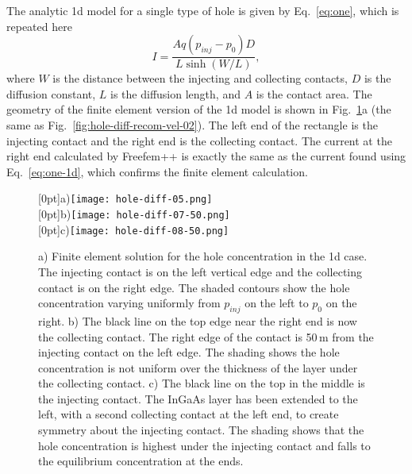 The analytic 1d model for a single type of hole is given by
Eq.~\ref{eq:one}, which is repeated here
\begin{equation}
I = \frac{Aq(p_{inj}-p_0)D}{L\sinh(W/L)},
\label{eq:one-1d}\end{equation}
where $W$ is the distance between the injecting and collecting
contacts, $D$ is the diffusion constant, $L$ is the diffusion
length, and $A$ is the contact area.
The geometry of the finite element version of the 1d model is
shown in Fig.~\ref{fig:hole-diff-05}a
 (the same as Fig.~\ref{fig:hole-diff-recom-vel-02}).
The left end of the rectangle is the injecting contact and the right
end is the collecting contact.
The current at the right end calculated by Freefem++ is exactly the same
as the current found using Eq.~\ref{eq:one-1d}, which confirms the
finite element calculation.

\begin{figure}[t]
\centering
\raisebox{2.5ex}[0pt]{a)}\texttt{[image: hole-diff-05.png]}\\
\raisebox{2.5ex}[0pt]{b)}\texttt{[image: hole-diff-07-50.png]}\\
\raisebox{2.0ex}[0pt]{c)}\texttt{[image: hole-diff-08-50.png]}
\caption{a) Finite element solution for the hole concentration 
in the 1d case.  The injecting contact is on the left vertical edge and the
collecting contact is on the right edge.  The shaded contours show
 the hole concentration
varying uniformly from $p_{inj}$ on the left to $p_0$ on the right.
b) The black line on the top edge near the right end is now the collecting
contact.  The right edge of the contact is 50\,\textmu m from the injecting
contact on the left edge.  The shading shows the hole concentration is not
uniform over the thickness of the layer under the collecting contact.
c) The black line on the top in the middle is the injecting contact.  The InGaAs
layer has been extended to the left, with a second collecting contact at the
 left end, to create symmetry about the injecting contact.  The shading shows
that the hole concentration is highest under the injecting contact and
falls to the equilibrium concentration at the ends.
}%
\label{fig:hole-diff-05}
\end{figure}

